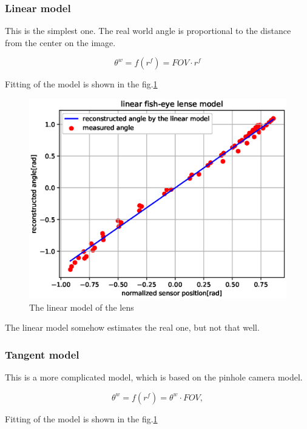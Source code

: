 \documentclass[a4paper,12pt,titlepage]{article}
\numberwithin{figure}{section}
\begin{document}
\subsubsection{Linear model}

This is the simplest one. The real world angle is proportional to the distance from the center on the image. 

\begin{equation}
\theta^w = f(r^f) = FOV \cdot r^f
\end{equation}

Fitting of the model is shown in the fig.\ref{fig:linear_model}

\begin{figure}[h!]
\centering
\includegraphics[width=1\linewidth]{fig/linear_model3.eps}
\caption{The linear model of the lens}
\label{fig:linear_model}
\end{figure}

The linear model somehow estimates the real one, but not that well.

\subsubsection{Tangent model}

This is a more complicated model, which is based on the pinhole camera model.

\begin{equation}
\theta^w = f(r^f) = \theta^w \cdot FOV,
\end{equation}

Fitting of the model is shown in the fig.\ref{fig:linear_model}
\end{document}
